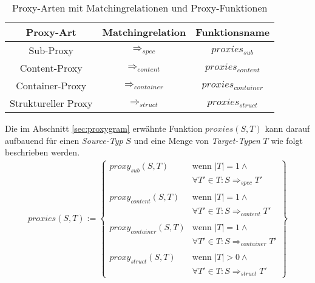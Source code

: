 \begin{table}[H]
\centering
\begin{tabular}{|c|c|c|}
\hline
\hline
\centering\textbf{Proxy-Art} & \textbf{Matchingrelation} & \textbf{Funktionsname}\\
\hline
\hline
Sub-Proxy
&  
$\Rightarrow_{spec}$
& 
$\mathit{proxies_{sub}}$
\\
\hline
Content-Proxy
& 
$\Rightarrow_{content}$
& 
$\mathit{proxies_{content}}$
\\
\hline
Container-Proxy
& 
$\Rightarrow_{container}$
& 
$\mathit{proxies_{container}}$
\\
\hline
Struktureller Proxy
&
$\Rightarrow_{struct}$
& 
$\mathit{proxies_{struct}}$
 \\
\hline
\hline
\end{tabular}
\caption{Proxy-Arten mit Matchingrelationen und Proxy-Funktionen}
 \label{tab:baseMatcher}
\end{table}
\noindent
Die im Abschnitt \ref{sec:proxygram} erwähnte Funktion $\mathit{proxies(S,T)}$ kann darauf aufbauend für einen \emph{Source-Typ} $S$ und eine Menge von \emph{Target-Typen} $T$ wie folgt beschrieben werden.
\begin{gather*}
\mathit{proxies(S,T)} := 
\left\{\begin{array}{ll}
\mathit{proxy_{sub}(S,T)}	& \text{wenn } |T| = 1 \wedge \mathit{ }\\
& \forall T' \in T: S \Rightarrow_{spec} T'\\	
&\\
\mathit{proxy_{content}(S,T)}	& \text{wenn } |T| = 1 \wedge \mathit{ }\\
& \forall T' \in T: S \Rightarrow_{content} T' \\
&\\
\mathit{proxy_{container}(S,T)} & \text{wenn } |T| = 1 \wedge \mathit{ } \\
& \forall T' \in T: S \Rightarrow_{container} T' \\
&\\
\mathit{proxy_{struct}(S,T)} & \text{wenn } |T| > 0 \wedge \mathit{ } \\
&\forall T' \in T: S \Rightarrow_{struct} T'
		 \end{array}
\right\}
\end{gather*}
